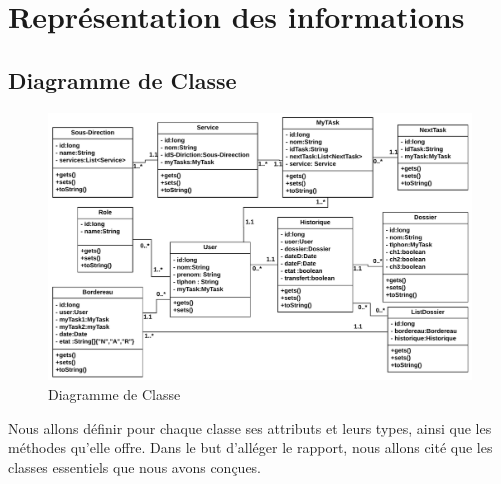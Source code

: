  \section{ Représentation des informations }
 \subsection{Diagramme de Classe}
\begin{figure}[H]
	\centering
	\includegraphics[width=1\linewidth,height=0.7\paperheight]{images/class01}
	\caption{Diagramme de Classe}
	\label{fig:class01}
\end{figure}

Nous allons définir pour chaque classe ses attributs et leurs types, ainsi que les méthodes qu’elle offre. Dans le but d’alléger le rapport, nous allons cité que les classes essentiels que nous avons conçues.
 
 
